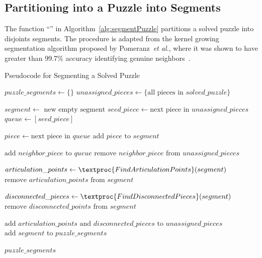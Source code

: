 \subsection{Partitioning into a Puzzle into Segments}\label{sec:segmentPuzzle}

The function ``'' in Algorithm~\ref{alg:segmentPuzzle} partitions a solved puzzle into disjoints segments.  The procedure is adapted from the kernel growing segmentation algorithm proposed by Pomeranz~\textit{et al.}, where it was shown to have greater than 99.7\% accuracy identifying genuine neighbors~\cite{pomeranz2011}. 

\begin{algorithm}[tb]
\caption{Pseudocode for Segmenting a Solved Puzzle}\label{alg:segmentPuzzle}
\begin{algorithmic}[1]
    \State $puzzle\_segments \gets \{ \}$
    \State $unassigned\_pieces \gets \{ \text{all pieces in } solved\_puzzle \}$
\item[]
        \State $segment \gets \text{ new empty segment}$
        \State $seed\_piece \gets \text{next piece in } unassigned\_pieces$
        \State $queue \gets [seed\_piece]$
\item[]
            \State $piece \gets \text{next piece in } queue$
            \State $\text{add } piece \text{ to } segment$
\item[]
            		\State $\text{add } neighbor\_piece \text{ to } \textit{queue}$
            		\State $\text{remove } neighbor\_piece \text{ from } unassigned\_pieces$
            	\EndIf
            \EndFor
        \EndWhile
\item[]
        \State $articulation\_points \gets \textproc{FindArticulationPoints}(segment)$
        \State $\text{remove } articulation\_points \text{ from } \textit{segment}$
\item[]
		\State $disconnected\_pieces \gets \textproc{FindDisconnectedPieces}(segment)$ 
		\State $\text{remove } disconnected\_points \text{ from } segment$
\item[]
        \State $\text{add } \textit{articulation\_points} \text{ and } \textit{disconnected\_pieces} \text{ to } \textit{unassigned\_pieces}$               	
		\State $\text{add } segment \text{ to } puzzle\_segments$	
    \EndWhile
\item[]
    \State \Return $puzzle\_segments$
\EndFunction
\end{algorithmic}
\end{algorithm}

